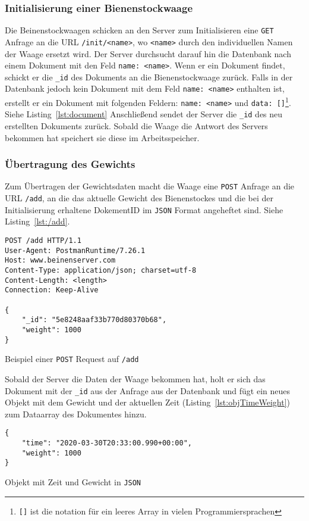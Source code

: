 \documentclass[a4paper, ngerman, 12pt]{scrartcl}
\begin{document}
\subsubsection[Initialisierung]{Initialisierung einer Bienenstockwaage}
Die Beinenstockwaagen schicken an den Server zum Initialisieren eine \texttt{GET} Anfrage an die URL \texttt{/init/<name>}, wo \texttt{<name>} durch den individuellen Namen der Waage ersetzt wird.
Der Server durchsucht darauf hin die Datenbank nach einem Dokument mit den Feld \texttt{name: <name>}.
Wenn er ein Dokument findet, schickt er die \texttt{\_id} des Dokuments an die Bienenstockwaage zurück.
Falls in der Datenbank jedoch kein Dokument mit dem Feld \texttt{name: <name>} enthalten ist,
erstellt er ein Dokument mit folgenden Feldern: \texttt{name: <name>} und \texttt{data: []}\footnote{\texttt{[]} ist die notation für ein leeres Array in vielen Programmiersprachen}. Siehe Listing~\ref{lst:document}
Anschließend sendet der Server die \texttt{\_id} des neu erstellten Dokuments zurück.
Sobald die Waage die Antwort des Servers bekommen hat speichert sie diese im Arbeitsspeicher.


\subsubsection{Übertragung des Gewichts}
Zum Übertragen der Gewichtsdaten macht die Waage eine \texttt{POST} Anfrage an die URL \texttt{/add}, an die das aktuelle Gewicht des Bienenstockes und die bei der Initialisierung erhaltene DokementID im \texttt{JSON} Format angeheftet sind. Siehe Listing~\ref{lst:/add}.
\begin{listing}[ht]
\centering
\begin{verbatim}
POST /add HTTP/1.1
User-Agent: PostmanRuntime/7.26.1
Host: www.beinenserver.com
Content-Type: application/json; charset=utf-8
Content-Length: <length>
Connection: Keep-Alive

{
	"_id": "5e8248aaf33b770d80370b68",
	"weight": 1000
}
\end{verbatim}
\caption{Beispiel einer \texttt{POST} Request auf \texttt{/add}}\label{lst:/add}
\end{listing}

Sobald der Server die Daten der Waage bekommen hat, holt er sich das Dokument mit der \texttt{\_id} aus der Anfrage aus der Datenbank und fügt ein neues Objekt mit dem Gewicht und der aktuellen Zeit (Listing~\ref{lst:objTimeWeight}) zum Dataarray des Dokumentes hinzu.
\begin{listing}[ht]
\centering
\begin{verbatim}
{
	"time": "2020-03-30T20:33:00.990+00:00",
	"weight": 1000
}
\end{verbatim}
\caption{Objekt mit Zeit und Gewicht in \texttt{JSON}\label{lst:objTimeWeight}}
\end{listing}
\end{document}
